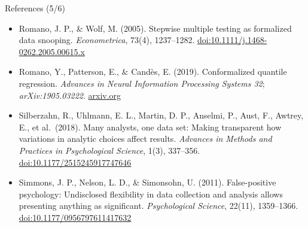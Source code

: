 \begin{frame}{References (5/6)}
\begin{itemize}
    \item Romano, J. P., \& Wolf, M. (2005). Stepwise multiple testing as formalized data snooping. \textit{Econometrica}, 73(4), 1237--1282. \href{https://doi.org/10.1111/j.1468-0262.2005.00615.x}{doi:10.1111/j.1468-0262.2005.00615.x}
    \item Romano, Y., Patterson, E., \& Candès, E. (2019). Conformalized quantile regression. \textit{Advances in Neural Information Processing Systems 32}; \textit{arXiv:1905.03222}. \href{https://arxiv.org/abs/1905.03222}{arxiv.org}
    \item Silberzahn, R., Uhlmann, E. L., Martin, D. P., Anselmi, P., Aust, F., Awtrey, E., et al.\ (2018). Many analysts, one data set: Making transparent how variations in analytic choices affect results. \textit{Advances in Methods and Practices in Psychological Science}, 1(3), 337--356. \href{https://doi.org/10.1177/2515245917747646}{doi:10.1177/2515245917747646}
    \item Simmons, J. P., Nelson, L. D., \& Simonsohn, U. (2011). False-positive psychology: Undisclosed flexibility in data collection and analysis allows presenting anything as significant. \textit{Psychological Science}, 22(11), 1359--1366. \href{https://doi.org/10.1177/0956797611417632}{doi:10.1177/0956797611417632}
\end{itemize}
\end{frame}

